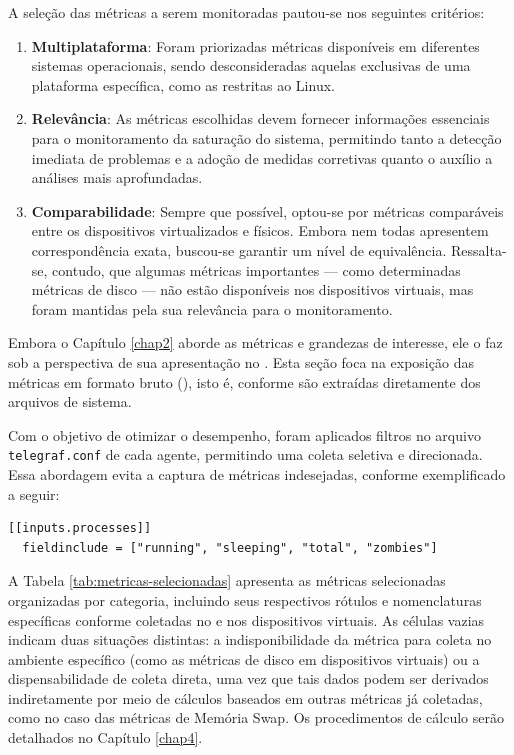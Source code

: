 A seleção das métricas a serem monitoradas pautou-se nos seguintes critérios:
\begin{enumerate}
\item \textbf{Multiplataforma}: Foram priorizadas métricas disponíveis em diferentes sistemas operacionais, sendo desconsideradas aquelas exclusivas de uma plataforma específica, como as restritas ao Linux.
\item \textbf{Relevância}: As métricas escolhidas devem fornecer informações essenciais para o monitoramento da saturação do sistema, permitindo tanto a detecção imediata de problemas e a adoção de medidas corretivas quanto o auxílio a análises mais aprofundadas.
\item \textbf{Comparabilidade}: Sempre que possível, optou-se por métricas comparáveis entre os dispositivos virtualizados e físicos. Embora nem todas apresentem correspondência exata, buscou-se garantir um nível de equivalência. Ressalta-se, contudo, que algumas métricas importantes --- como determinadas métricas de disco --- não estão disponíveis nos dispositivos virtuais, mas foram mantidas pela sua relevância para o monitoramento.
\end{enumerate}

Embora o Capítulo \ref{chap2} aborde as métricas e grandezas de interesse, ele o faz sob a perspectiva de sua apresentação no . Esta seção foca na exposição das métricas em formato bruto (), isto é, conforme são extraídas diretamente dos arquivos de sistema.

Com o objetivo de otimizar o desempenho, foram aplicados filtros no arquivo \verb|telegraf.conf| de cada agente, permitindo uma coleta seletiva e direcionada. Essa abordagem evita a captura de métricas indesejadas, conforme exemplificado a seguir:

\newpage

\begin{lstlisting}[caption={Exemplo de filtragem de métricas selecionadas.}, label={lst:exemplo-filtro}]
[[inputs.processes]] 
  fieldinclude = ["running", "sleeping", "total", "zombies"]
\end{lstlisting}

A Tabela \ref{tab:metricas-selecionadas} apresenta as métricas selecionadas organizadas por categoria, incluindo seus respectivos rótulos e nomenclaturas específicas conforme coletadas no  e nos dispositivos virtuais. As células vazias indicam duas situações distintas: a indisponibilidade da métrica para coleta no ambiente específico (como as métricas de disco em dispositivos virtuais) ou a dispensabilidade de coleta direta, uma vez que tais dados podem ser derivados indiretamente por meio de cálculos baseados em outras métricas já coletadas, como no caso das métricas de Memória Swap. Os procedimentos de cálculo serão detalhados no Capítulo \ref{chap4}.

